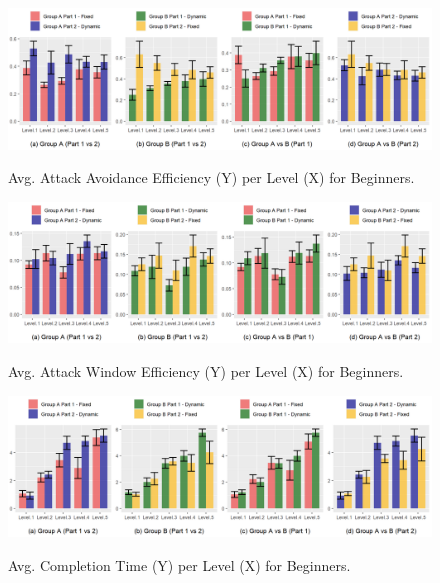 \begin{figure}[!ht]
    \begin{center}
    \caption{Avg. Attack Avoidance Efficiency (Y) per Level (X) for Beginners.}
        \includegraphics[width=\textwidth]{figures/attack_avoidance_efficiency-beginner_players.png}
        \label{fig:result-metric-beginners-attack-avoidance-efficiency}
    \end{center}
\end{figure}

\begin{figure}[!ht]
    \begin{center}
    \caption{Avg. Attack Window Efficiency (Y) per Level (X) for Beginners.}
        \includegraphics[width=\textwidth]{figures/attack_window_efficiency-beginner_players.png}
        \label{fig:result-metric-beginners-attack-window-efficiency}
    \end{center}
\end{figure}

\begin{figure}[!ht]
    \begin{center}
    \caption{Avg. Completion Time (Y) per Level (X) for Beginners.}
        \includegraphics[width=\textwidth]{figures/completion_time-beginner_players.png}
        \label{fig:result-metric-beginners-completion-time}
    \end{center}
\end{figure}

